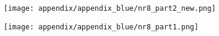 \begin{figure}[hbtp]
    \centering
    \texttt{[image: appendix/appendix\_blue/nr8\_part2\_new.png]}
    \caption*{}
    \label{fig:nr8_part2}
\end{figure}

\begin{figure}[hbtp]
    \centering
    \texttt{[image: appendix/appendix\_blue/nr8\_part1.png]}
    \caption*{}
    \label{fig:nr8_part1}
\end{figure}


